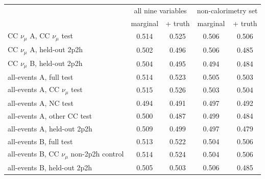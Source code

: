 \begin{tabular}{lcccc}
\toprule
 & \multicolumn{2}{c}{all nine variables} & \multicolumn{2}{c}{non-calorimetry set} \\
 & marginal & + truth & marginal & + truth \\
\midrule
CC $\nu_\mu$ A, CC $\nu_\mu$ test & 0.514 & 0.525 & 0.506 & 0.506 \\
CC $\nu_\mu$ A, held-out 2p2h & 0.502 & 0.496 & 0.506 & 0.485 \\
CC $\nu_\mu$ B, held-out 2p2h & 0.504 & 0.495 & 0.494 & 0.484 \\
\midrule
all-events A, full test & 0.514 & 0.523 & 0.505 & 0.503 \\
all-events A, CC $\nu_\mu$ test & 0.515 & 0.526 & 0.503 & 0.504 \\
all-events A, NC test & 0.494 & 0.491 & 0.497 & 0.492 \\
all-events A, other CC test & 0.500 & 0.487 & 0.499 & 0.484 \\
all-events A, held-out 2p2h & 0.509 & 0.499 & 0.497 & 0.479 \\
all-events B, full test & 0.513 & 0.522 & 0.504 & 0.506 \\
all-events B, CC $\nu_\mu$ non-2p2h control & 0.514 & 0.524 & 0.504 & 0.506 \\
all-events B, held-out 2p2h & 0.505 & 0.503 & 0.506 & 0.485 \\
\bottomrule
\end{tabular}
